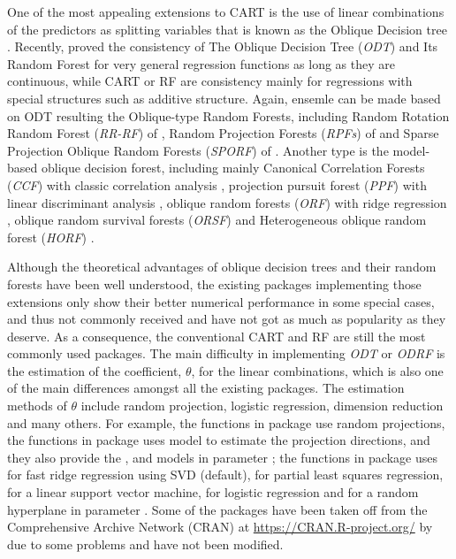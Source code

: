 \documentclass[nojss]{jss}
\newcommand{\fct}[1]{\code{#1()}}
\numberwithin{equation}{section}
\begin{document}
One of the most appealing extensions to CART is the use of linear combinations of the predictors as splitting variables that is known as the Oblique Decision tree \cite{Heath93inductionof}. Recently, \cite{zhan2022consistency} proved the consistency of The Oblique Decision Tree (\emph{ODT}) and Its Random Forest for very general regression functions as long as they are continuous, while CART or RF are consistency mainly for regressions with special structures such as additive structure.  Again, ensemle can be made based on ODT resulting the Oblique-type Random Forests, including Random Rotation Random Forest (\emph{RR-RF}) of \cite{blaser2016random}, Random Projection Forests (\emph{RPFs}) of \cite{lee2015fast} and Sparse Projection Oblique Random Forests (\emph{SPORF}) of \cite{tomita2020sparse}. Another type is the model-based oblique decision forest,  including mainly Canonical Correlation Forests (\emph{CCF}) with classic correlation analysis \cite{rainforth2015canonical},  projection pursuit forest (\emph{PPF}) with linear discriminant analysis \cite{silva2021projection}, oblique random forests (\emph{ORF}) with ridge regression \cite{menze2011oblique}, oblique random survival forests (\emph{ORSF}) \cite{jaeger2022accelerated} and Heterogeneous oblique random forest (\emph{HORF}) \cite{katuwal2020heterogeneous}.


Although the theoretical advantages of oblique decision trees and their random forests have been well understood, the existing packages implementing those extensions only show their better numerical performance in some special cases, and thus not commonly received and have not got as much as popularity as they deserve. As a consequence, the conventional CART and RF are still the most commonly used packages.    The main difficulty in implementing \emph{ODT} or \emph{ODRF} is the estimation of the coefficient, $ \theta $, for the linear combinations, which is also one of the main differences amongst all the existing packages. The estimation methods  of $ \theta $ include random projection, logistic regression, dimension reduction and many others. For example, the functions \fct{RerF} in  package \cite{tomita2020sparse} use random projections, the functions \fct{baggtree} in  package \cite{silva2021projection} uses   model to estimate the projection directions, and they also provide the  ,  and   models in parameter ; the functions \fct{obliqueRF} in  package \cite{menze2011oblique} uses  for fast ridge regression using SVD (default),  for partial least squares regression,  for a linear support vector machine,  for logistic regression and  for a random hyperplane in parameter . %
Some of the  packages have been taken off from the Comprehensive  Archive Network (CRAN) at \url{https://CRAN.R-project.org/} by \citep{R} due to some problems and have not been modified.
\end{document}
